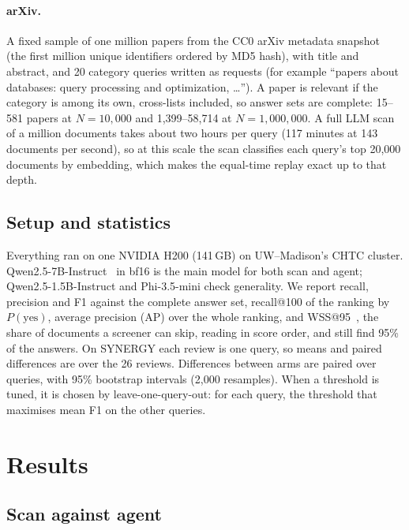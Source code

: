 \documentclass[11pt]{article}
\begin{document}
\paragraph{arXiv.}
A fixed sample of one million papers from the CC0 arXiv metadata
snapshot~\cite{clement2019arxiv} (the first million unique identifiers ordered
by MD5 hash), with title and abstract, and 20 category queries written as
requests (for example ``papers about databases: query processing and
optimization, \ldots''). A paper is relevant if the category is among its own,
cross-lists included, so answer sets are complete: 15--581 papers at
$N=10{,}000$ and 1,399--58,714 at $N=1{,}000{,}000$. A full LLM scan of a million
documents takes about two hours per query (117 minutes at 143 documents per
second), so at this scale the scan
classifies each query's top 20,000 documents by embedding, which makes the
equal-time replay exact up to that depth.

\subsection{Setup and statistics}

Everything ran on one NVIDIA H200 (141\,GB) on UW--Madison's CHTC cluster.
Qwen2.5-7B-Instruct~\cite{qwen2025qwen25} in bf16 is the main model for both
scan and agent; Qwen2.5-1.5B-Instruct and Phi-3.5-mini check generality. We
report recall, precision and F1 against the complete answer set, recall@100
of the ranking by $P(\text{yes})$, average precision (AP) over the whole ranking,
and WSS@95~\cite{cohen2006wss}, the share of documents a screener can skip,
reading in score order, and still find 95\% of the answers. On SYNERGY each review
is one query, so means and paired differences are over the 26 reviews. Differences between arms are
paired over queries, with 95\% bootstrap intervals (2,000 resamples). When a
threshold is tuned, it is chosen by leave-one-query-out: for each query, the
threshold that maximises mean F1 on the other queries.

\section{Results}

\subsection{Scan against agent}
\label{sec:headline}
\end{document}
